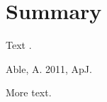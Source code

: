 \documentclass{article}
\begin{document}
\section{Summary}
Text \citep{a}.

 Able, A. 2011, ApJ.

More text.
\end{document}
